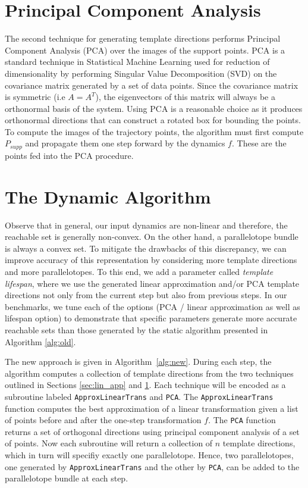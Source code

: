 \section{Principal Component Analysis}
\label{sec:pca}
The second technique for generating template directions performs Principal Component Analysis (PCA) over the images of the support points.
%
PCA is a standard technique in Statistical Machine Learning used for reduction of dimensionality by performing Singular Value Decomposition (SVD) on the covariance matrix generated by a set of data points.
%
Since the covariance matrix is symmetric (i.e $A = A^T$), the eigenvectors of this matrix will always be a orthonormal basis of the system.
%
Using PCA is a reasonable choice as it produces orthonormal directions that can construct a rotated box for bounding the points.
%
To compute the images of the trajectory points, the algorithm must first compute $P_{supp}$ and propagate them one step forward by the dynamics $f$. These are the points fed into the PCA procedure.

\section{The Dynamic Algorithm}
\label{sec:dyna_algo}
Observe that in general, our input dynamics are non-linear and therefore, the reachable set is generally non-convex.
%
On the other hand, a parallelotope bundle is always a convex set.
%
To mitigate the drawbacks of this discrepancy, we can improve accuracy of this representation by considering more template directions and more parallelotopes.
%
To this end, we add a parameter called \emph{template lifespan}, where we use the generated linear approximation and/or PCA template directions not only from the current step but also from previous steps.
%
 In our benchmarks, we tune each of the options (PCA / linear approximation as well as lifespan option) to demonstrate that specific parameters generate more accurate reachable sets than those generated by the static algorithm presented in Algorithm \ref{alg:old}.

The new approach is given in Algorithm~\ref{alg:new}.
%
During each step, the algorithm computes a collection of template directions from the two techniques outlined in Sections \ref{sec:lin_app} and \ref{sec:pca}. Each technique will be encoded as a subroutine labeled \texttt{ApproxLinearTrans} and \texttt{PCA}.
%
The \texttt{ApproxLinearTrans} function computes the best approximation of a linear transformation given a list of points before and after the one-step transformation $f$.
%
The \texttt{PCA} function returns a set of orthogonal directions using principal component analysis of a set of points.
%
Now each subroutine will return a collection of $n$ template directions, which in turn will specifiy exactly one parallelotope.
%
Hence, two parallelotopes, one generated by \texttt{ApproxLinearTrans} and the other by \texttt{PCA}, can be added to the parallelotope bundle at each step.
%

